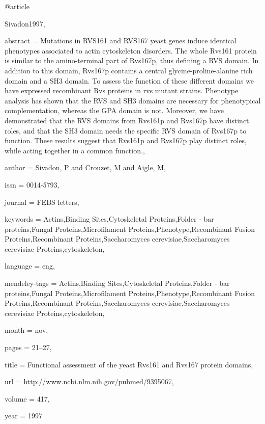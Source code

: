@article{Sivadon1997,

abstract = {Mutations in RVS161 and RVS167 yeast genes induce identical phenotypes associated to actin cytoskeleton disorders. The whole Rvs161 protein is similar to the amino-terminal part of Rvs167p, thus defining a RVS domain. In addition to this domain, Rvs167p contains a central glycine-proline-alanine rich domain and a SH3 domain. To assess the function of these different domains we have expressed recombinant Rvs proteins in rvs mutant strains. Phenotype analysis has shown that the RVS and SH3 domains are necessary for phenotypical complementation, whereas the GPA domain is not. Moreover, we have demonstrated that the RVS domains from Rvs161p and Rvs167p have distinct roles, and that the SH3 domain needs the specific RVS domain of Rvs167p to function. These results suggest that Rvs161p and Rvs167p play distinct roles, while acting together in a common function.},

author = {Sivadon, P and Crouzet, M and Aigle, M},

issn = {0014-5793},

journal = {FEBS letters},

keywords = {Actins,Binding Sites,Cytoskeletal Proteins,Folder - bar proteins,Fungal Proteins,Microfilament Proteins,Phenotype,Recombinant Fusion Proteins,Recombinant Proteins,Saccharomyces cerevisiae,Saccharomyces cerevisiae Proteins,cytoskeleton},

language = {eng},

mendeley-tags = {Actins,Binding Sites,Cytoskeletal Proteins,Folder - bar proteins,Fungal Proteins,Microfilament Proteins,Phenotype,Recombinant Fusion Proteins,Recombinant Proteins,Saccharomyces cerevisiae,Saccharomyces cerevisiae Proteins,cytoskeleton},

month = {nov},

pages = {21--27},

title = {{Functional assessment of the yeast Rvs161 and Rvs167 protein domains}},

url = {http://www.ncbi.nlm.nih.gov/pubmed/9395067},

volume = {417},

year = {1997}

}

